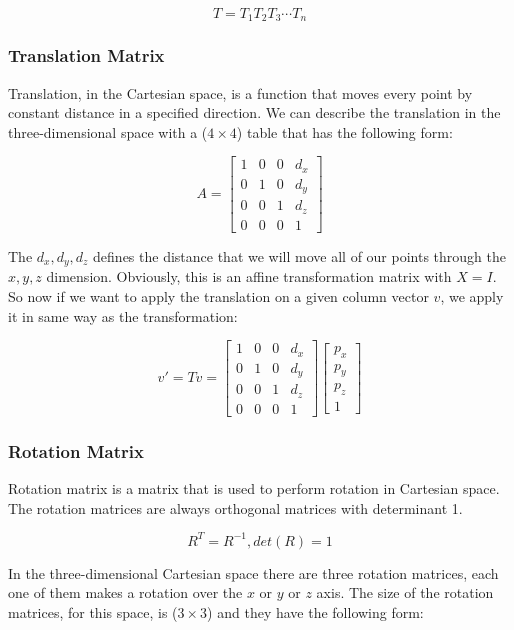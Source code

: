 \[
T = T_1T_2T_3 \cdots T_n
\]

\subsubsection*{Translation Matrix}
Translation, in the Cartesian space, is a function that moves every point by constant distance in a specified direction. We can describe the translation in the three-dimensional space with a (\(4\times4\)) table that has the following form:

\[
A = 
\begin{bmatrix}
1 & 0 & 0 & d_x\\
0 & 1 & 0 & d_y\\
0 & 0 & 1 & d_z\\
0 & 0 & 0 & 1
\end{bmatrix}
\]

The \(d_x,d_y,d_z\) defines the distance that we will move all of our points through the \(x,y,z\) dimension. Obviously, this is an affine transformation matrix with \(X = I\). So now if we want to apply the translation on a given column vector \(v\), we apply it in same way as the transformation:

\[
v' = Tv =
\begin{bmatrix}
1 & 0 & 0 & d_x\\
0 & 1 & 0 & d_y\\
0 & 0 & 1 & d_z\\
0 & 0 & 0 & 1
\end{bmatrix}
\begin{bmatrix}
p_x\\
p_y\\
p_z\\
1
\end{bmatrix}
\]

\subsubsection*{Rotation Matrix}
Rotation matrix is a matrix that is used to perform rotation in Cartesian space. The rotation matrices are always orthogonal matrices with determinant 1.

\[R^T = R^{-1},det(R) = 1\]

In the three-dimensional Cartesian space there are three rotation matrices, each one of them makes a rotation over the \(x\)  or \(y\)  or \(z\) axis. The size of the rotation matrices, for this space, is (\(3\times3\)) and they have the following form:

